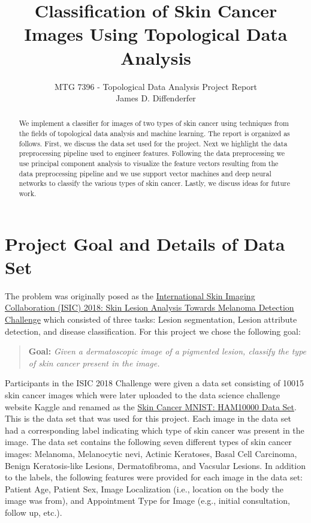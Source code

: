 \documentclass[11pt, reqno]{amsart}
\title{Classification of Skin Cancer Images Using Topological Data Analysis}
\author{MTG 7396 - Topological Data Analysis Project Report\\James D. Diffenderfer}
\theoremstyle{plain}
\theoremstyle{definition}
\begin{document}
\maketitle

\begin{abstract}
We implement a classifier for images of two types of skin cancer using techniques from the fields of topological data analysis and machine learning. The report is organized as follows. First, we discuss the data set used for the project. Next we highlight the data preprocessing pipeline used to engineer features. Following the data preprocessing we use principal component analysis to visualize the feature vectors resulting from the data preprocessing pipeline and we use support vector machines and deep neural networks to classify the various types of skin cancer. Lastly, we discuss ideas for future work.
\end{abstract}

\section{Project Goal and Details of Data Set}
The problem was originally posed as the \href{https://challenge2018.isic-archive.com/}{International Skin Imaging Collaboration (ISIC) 2018: Skin Lesion Analysis Towards Melanoma Detection Challenge} which consisted of three tasks: Lesion segmentation, Lesion attribute detection, and disease classification. For this project we chose the following goal:

\vspace{2mm}
\begin{quote}
    {\bfseries Goal:} \emph{Given a dermatoscopic image of a pigmented lesion, classify the type of skin cancer present in the image.}
\end{quote}
\vspace{2mm}

Participants in the ISIC 2018 Challenge were given a data set consisting of 10015 skin cancer images which were later uploaded to the data science challenge website Kaggle and renamed as the \href{https://www.kaggle.com/kmader/skin-cancer-mnist-ham10000}{Skin Cancer MNIST: HAM10000 Data Set}. This is the data set that was used for this project. Each image in the data set had a corresponding label indicating which type of skin cancer was present in the image. The data set contains the following seven different types of skin cancer images: Melanoma, Melanocytic nevi, Actinic Keratoses, Basal Cell Carcinoma, Benign Keratosis-like Lesions, Dermatofibroma, and Vacsular Lesions. In addition to the labels, the following features were provided for each image in the data set: Patient Age, Patient Sex, Image Localization (i.e., location on the body the image was from), and Appointment Type for Image (e.g., initial consultation, follow up, etc.). 
\end{document}
